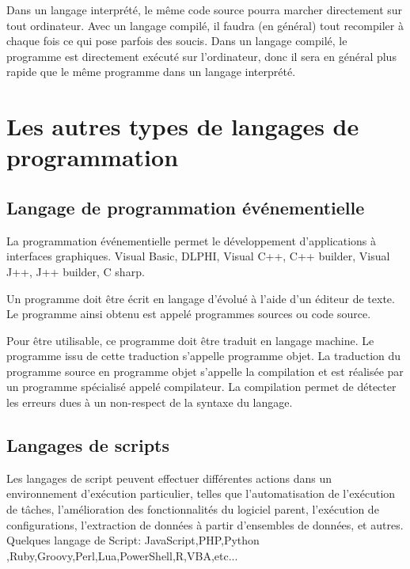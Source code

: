 \documentclass[a4paper,12pt]{article} %
\begin{document}
Dans un langage interprété, le même code source pourra marcher directement sur tout ordinateur. Avec un langage compilé, il faudra (en général) tout recompiler à chaque fois ce qui pose parfois des soucis.
Dans un langage compilé, le programme est directement exécuté sur l'ordinateur, donc il sera en général plus rapide que le même programme dans un langage interprété.

\section{Les autres types de langages de programmation}

\subsection{Langage de programmation événementielle}

La programmation événementielle permet le développement d'applications à interfaces graphiques.
Visual Basic, DLPHI, Visual C++, C++ builder, Visual J++, J++ builder, C sharp.

Un programme doit être écrit en langage d'évolué à l'aide d'un éditeur de texte. Le programme ainsi obtenu est appelé programmes sources ou code source.

Pour être utilisable, ce programme doit être traduit en langage machine. Le programme issu de cette traduction s'appelle programme objet.
La traduction du programme source en programme objet s'appelle la compilation et est réalisée par un programme spécialisé appelé compilateur.
La compilation permet de détecter les erreurs dues à un non-respect de la syntaxe du langage.

\subsection{Langages de scripts}

Les langages de script peuvent effectuer différentes actions dans un environnement d’exécution particulier, telles que l’automatisation de l’exécution de tâches, l’amélioration des fonctionnalités du logiciel parent, l’exécution de configurations, l’extraction de données à partir d’ensembles de données, et autres.
Quelques langage de Script: JavaScript,PHP,Python ,Ruby,Groovy,Perl,Lua,PowerShell,R,VBA,etc...
\end{document}
